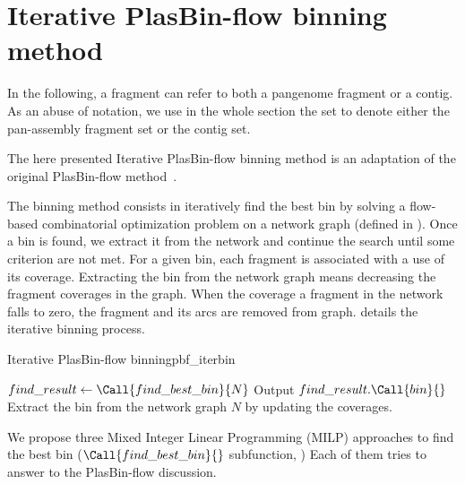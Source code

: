 \section{Iterative PlasBin-flow binning method}\label{sec:pbf_iterbin}

In the following, a fragment can refer to both a pangenome fragment or a contig.
As an abuse of notation, we use in the whole section the set \Fragments{} to denote either the pan-assembly fragment set or the contig set.

The here presented Iterative PlasBin-flow binning method is an adaptation of the original PlasBin-flow method~\cite{manePlasBinflowFlowbasedMILP2023}.

The binning method consists in iteratively find the best bin by solving a flow-based combinatorial optimization problem on a network graph (defined in ).
Once a bin is found, we extract it from the network and continue the search until some criterion are not met.
For a given bin, each fragment is associated with a use of its coverage.
Extracting the bin from the network graph means decreasing the fragment coverages in the graph.
When the coverage a fragment in the network falls to zero, the fragment and its arcs are removed from graph.
 details the iterative binning process.

\begin{tcbalgo}{Iterative PlasBin-flow binning}{pbf_iterbin}
  \begin{algorithmic}[1]
    \State{} \( find\_result \gets \Call{find\_best\_bin}{ N } \)
    \State{} Output \( find\_result.\Call{bin}{ } \)
    \State{} Extract the bin from the network graph \(N\) by updating the coverages.
    \EndIf{}
    \EndWhile{}
    \EndFunction{}
  \end{algorithmic}
\end{tcbalgo}

We propose three Mixed Integer Linear Programming (MILP) approaches to find the best bin (\( \Call{find\_best\_bin}{} \) subfunction, )
Each of them tries to answer to the PlasBin-flow discussion.

